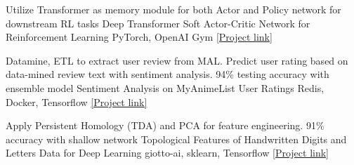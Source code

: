 \begin{cventries}

	\cventry
	{Utilize Transformer as memory module for both Actor and Policy network for downstream RL tasks}
	{Deep Transformer Soft Actor-Critic Network for Reinforcement Learning}
	{PyTorch, OpenAI Gym}
	{\href{https://github.com/sesem738/Frankenstein}{[Project link]}}
	{}
	\vspace{-6mm}

	\cventry
	{Datamine, ETL to extract user review from MAL. Predict user rating based on data-mined review text with sentiment analysis. 94\% testing accuracy with ensemble model}
	{Sentiment Analysis on MyAnimeList User Ratings}
	{Redis, Docker, Tensorflow}
	{\href{https://github.com/n0k0m3/rnn-mal-sentiment}{[Project link]}}
	{}
	\vspace{-6mm}

	\cventry
	{Apply Persistent Homology (TDA) and PCA for feature engineering. 91\% accuracy with shallow network}
	{Topological Features of Handwritten Digits and Letters Data for Deep Learning}
	{giotto-ai, sklearn, Tensorflow}
	{\href{https://colab.research.google.com/drive/18z161k3diYO6sNVBfiKH8uGqbrekxMPN?usp=sharing}{[Project link]}}
	{}
	\vspace{-6mm}
	
	
	
	
	
\end{cventries}